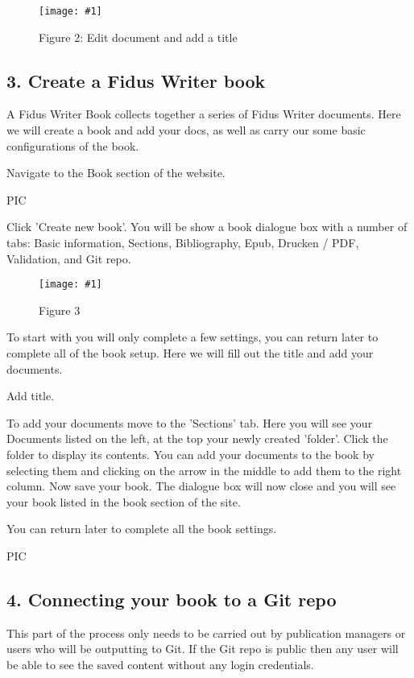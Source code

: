 \documentclass{article}
\newlength{\imgwidth}
\newcommand\scaledgraphics[2]{%
                
\settowidth{\imgwidth}{\texttt{[image: \#1]}}%
                
\setlength{\imgwidth}{\minof{\imgwidth}{#2\textwidth}}%
                
\texttt{[image: \#1]}%
                
}
\begin{document}
\begin{figure}
\scaledgraphics{2be7082d-cf81-4659-be99-15f41a555f0a.png}{1}
\caption*{Figure 2: Edit document and add a title}\label{F72135581}
\end{figure}


\subsection{3. Create a Fidus Writer book}\label{H642923}



A Fidus Writer Book collects together a series of Fidus Writer documents. Here we will create a book and add your docs, as well as carry our some basic configurations of the book.


Navigate to the Book section of the website.


PIC


Click 'Create new book'. You will be show a book dialogue box with a number of tabs: Basic information, Sections, Bibliography, Epub, Drucken / PDF, Validation, and Git repo.

\begin{figure}
\scaledgraphics{8a7e23ca-ece1-4c13-8192-e6b2ff7e5fc0.png}{1}
\caption*{Figure 3}\label{F63655341}
\end{figure}


To start with you will only complete a few settings, you can return later to complete all of the book setup. Here we will fill out the title and add your documents.


Add title.


To add your documents move to the 'Sections' tab. Here you will see your Documents listed on the left, at the top your newly created 'folder'. Click the folder to display its contents. You can add your documents to the book by selecting them and clicking on the arrow in the middle to add them to the right column. Now save your book. The dialogue box will now close and you will see your book listed in the book section of the site.


You can return later to complete all the book settings.


PIC


\subsection{4. Connecting your book to a Git repo}\label{H8269040}



This part of the process only needs to be carried out by publication managers or users who will be outputting to Git. If the Git repo is public then any user will be able to see the saved content without any login credentials.
\end{document}
